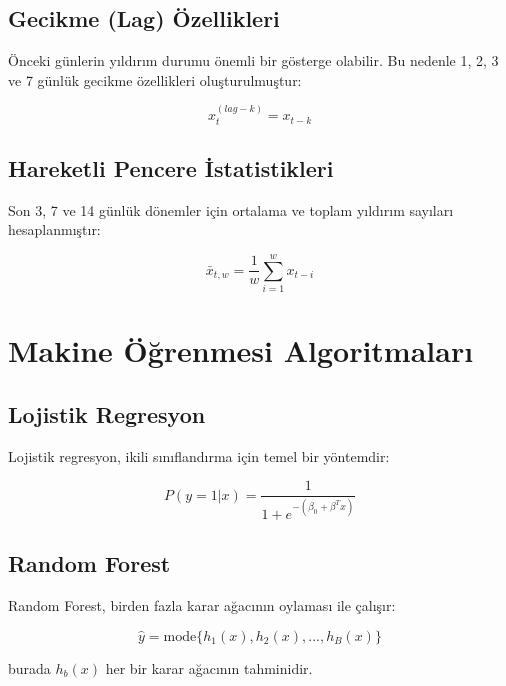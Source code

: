 \subsection{Gecikme (Lag) Özellikleri}

Önceki günlerin yıldırım durumu önemli bir gösterge olabilir. Bu nedenle 1, 2, 3 ve 7 günlük gecikme özellikleri oluşturulmuştur:

\begin{equation}
    x_t^{(lag-k)} = x_{t-k}
\end{equation}

\subsection{Hareketli Pencere İstatistikleri}

Son 3, 7 ve 14 günlük dönemler için ortalama ve toplam yıldırım sayıları hesaplanmıştır:

\begin{equation}
    \bar{x}_{t,w} = \frac{1}{w} \sum_{i=1}^{w} x_{t-i}
\end{equation}

\section{Makine Öğrenmesi Algoritmaları}

\subsection{Lojistik Regresyon}

Lojistik regresyon, ikili sınıflandırma için temel bir yöntemdir:

\begin{equation}
    P(y=1|x) = \frac{1}{1 + e^{-(\beta_0 + \beta^T x)}}
\end{equation}

\subsection{Random Forest}

Random Forest, birden fazla karar ağacının oylaması ile çalışır:

\begin{equation}
    \hat{y} = \text{mode}\{h_1(x), h_2(x), ..., h_B(x)\}
\end{equation}

burada $h_b(x)$ her bir karar ağacının tahminidir.

